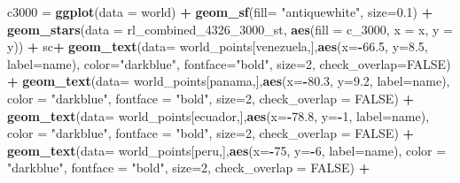 \documentclass[12pt,oneside]{reedthesis}
\newenvironment{Shaded}{\begin{snugshade}}{\end{snugshade}}
\newcommand{\DataTypeTok}[1]{\textcolor[rgb]{0.13,0.29,0.53}{#1}}
\newcommand{\DecValTok}[1]{\textcolor[rgb]{0.00,0.00,0.81}{#1}}
\newcommand{\FloatTok}[1]{\textcolor[rgb]{0.00,0.00,0.81}{#1}}
\newcommand{\KeywordTok}[1]{\textcolor[rgb]{0.13,0.29,0.53}{\textbf{#1}}}
\newcommand{\NormalTok}[1]{#1}
\newcommand{\OperatorTok}[1]{\textcolor[rgb]{0.81,0.36,0.00}{\textbf{#1}}}
\newcommand{\OtherTok}[1]{\textcolor[rgb]{0.56,0.35,0.01}{#1}}
\newcommand{\StringTok}[1]{\textcolor[rgb]{0.31,0.60,0.02}{#1}}
\begin{document}
\begin{Shaded}
\begin{Highlighting}[]
\NormalTok{c3000 =}\StringTok{ }\KeywordTok{ggplot}\NormalTok{(}\DataTypeTok{data =}\NormalTok{ world) }\OperatorTok{+}\StringTok{ }
\StringTok{  }\KeywordTok{geom_sf}\NormalTok{(}\DataTypeTok{fill=} \StringTok{"antiquewhite"}\NormalTok{, }\DataTypeTok{size=}\FloatTok{0.1}\NormalTok{) }\OperatorTok{+}\StringTok{ }
\StringTok{  }\KeywordTok{geom_stars}\NormalTok{(}\DataTypeTok{data =}\NormalTok{ rl_combined_}\DecValTok{4326}\NormalTok{_}\DecValTok{3000}\NormalTok{_st, }\KeywordTok{aes}\NormalTok{(}\DataTypeTok{fill =}\NormalTok{ c_}\DecValTok{3000}\NormalTok{, }\DataTypeTok{x =}\NormalTok{ x, }\DataTypeTok{y =}\NormalTok{ y)) }\OperatorTok{+}\StringTok{ }
\StringTok{  }\NormalTok{sc}\OperatorTok{+}
\StringTok{  }\KeywordTok{geom_text}\NormalTok{(}\DataTypeTok{data=}\NormalTok{ world_points[venezuela,],}\KeywordTok{aes}\NormalTok{(}\DataTypeTok{x=}\OperatorTok{-}\FloatTok{66.5}\NormalTok{, }\DataTypeTok{y=}\FloatTok{8.5}\NormalTok{, }\DataTypeTok{label=}\NormalTok{name), }\DataTypeTok{color=}\StringTok{"darkblue"}\NormalTok{, }\DataTypeTok{fontface=}\StringTok{"bold"}\NormalTok{, }\DataTypeTok{size=}\DecValTok{2}\NormalTok{, }\DataTypeTok{check_overlap=}\OtherTok{FALSE}\NormalTok{) }\OperatorTok{+}
\StringTok{  }\KeywordTok{geom_text}\NormalTok{(}\DataTypeTok{data=}\NormalTok{ world_points[panama,],}\KeywordTok{aes}\NormalTok{(}\DataTypeTok{x=}\OperatorTok{-}\FloatTok{80.3}\NormalTok{, }\DataTypeTok{y=}\FloatTok{9.2}\NormalTok{, }\DataTypeTok{label=}\NormalTok{name), }\DataTypeTok{color =} \StringTok{"darkblue"}\NormalTok{, }\DataTypeTok{fontface =} \StringTok{"bold"}\NormalTok{, }\DataTypeTok{size=}\DecValTok{2}\NormalTok{, }\DataTypeTok{check_overlap =} \OtherTok{FALSE}\NormalTok{) }\OperatorTok{+}\StringTok{ }
\StringTok{  }\KeywordTok{geom_text}\NormalTok{(}\DataTypeTok{data=}\NormalTok{ world_points[ecuador,],}\KeywordTok{aes}\NormalTok{(}\DataTypeTok{x=}\OperatorTok{-}\FloatTok{78.8}\NormalTok{, }\DataTypeTok{y=}\OperatorTok{-}\DecValTok{1}\NormalTok{, }\DataTypeTok{label=}\NormalTok{name), }\DataTypeTok{color =} \StringTok{"darkblue"}\NormalTok{, }\DataTypeTok{fontface =} \StringTok{"bold"}\NormalTok{, }\DataTypeTok{size=}\DecValTok{2}\NormalTok{, }\DataTypeTok{check_overlap =} \OtherTok{FALSE}\NormalTok{) }\OperatorTok{+}
\StringTok{  }\KeywordTok{geom_text}\NormalTok{(}\DataTypeTok{data=}\NormalTok{ world_points[peru,],}\KeywordTok{aes}\NormalTok{(}\DataTypeTok{x=}\OperatorTok{-}\DecValTok{75}\NormalTok{, }\DataTypeTok{y=}\OperatorTok{-}\DecValTok{6}\NormalTok{, }\DataTypeTok{label=}\NormalTok{name), }\DataTypeTok{color =} \StringTok{"darkblue"}\NormalTok{, }\DataTypeTok{fontface =} \StringTok{"bold"}\NormalTok{, }\DataTypeTok{size=}\DecValTok{2}\NormalTok{, }\DataTypeTok{check_overlap =} \OtherTok{FALSE}\NormalTok{) }\OperatorTok{+}

\end{Highlighting}
\end{Shaded}
\end{document}
